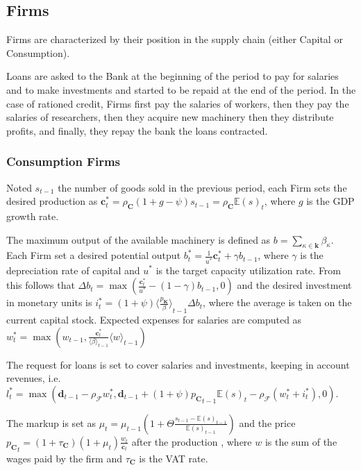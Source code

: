 \documentclass[a4paper, headings=standardclasses]{scrartcl}
\begin{document}
\subsection{Firms}
Firms are characterized by their position in the supply chain (either Capital or Consumption).

Loans are asked to the Bank at the beginning of the period to pay for salaries and to make investments and started to be repaid at the end of the period.
In the case of rationed credit, Firms first pay the salaries of workers, then they pay the salaries of researchers, then they acquire new machinery then they distribute profits, and finally, they repay the bank the loans contracted.

\subsubsection{Consumption Firms}
Noted $s_{t-1}$ the number of goods sold in the previous period, each Firm sets the desired production as $\mathbf{c}^*_t = \rho_\mathbf{C}(1+g-\psi)s_{t-1} = \rho_\mathbf{C}{\mathbb{E}(s)}_t$, where $g$ is the GDP growth rate.

The maximum output of the available machinery is defined as $b = \sum_{\kappa \in \mathbf{k}} \beta_\kappa$. Each Firm set a desired potential output $b^*_t = \frac{1}{u^*}\mathbf{c}^*_t + \gamma b_{t-1}$, where $\gamma$ is the depreciation rate of capital and $u^*$ is the target capacity utilization rate. From this follows that ${\Delta b}_t = \max(\frac{\mathbf{c}^*_t}{u^*} - (1 - \gamma) b_{t-1}, 0)$ and the desired investment in monetary units is $i^*_t = (1+\psi){\langle\frac{{p_\mathbf{K}}}{\beta}\rangle}_{t-1}{\Delta b}_t$, where the average is taken on the current capital stock. Expected expenses for salaries are computed as $w_t^* = \max(w_{t-1}, \frac{\mathbf{c}^*_t}{{\langle \beta \rangle}_{t-1}}{\langle w \rangle}_{t-1})$

The request for loans is set to cover salaries and investments, keeping in account revenues, i.e. $l_t^* = \max(\mathbf{d}_{t-1} - \rho_\mathcal{F} w_t^*, \mathbf{d}_{t-1} + (1+\psi){p_\mathbf{C}}_{t-1} {\mathbb{E}(s)}_t - \rho_\mathcal{F} (w_t^* + i_t^*), 0)$.

The markup is set as $\mu_t = \mu_{t-1}(1 + \Theta \frac{s_{t-1}-{\mathbb{E}(s)}_{t-1}}{{\mathbb{E}(s)}_{t-1}})$ and the price ${p_\mathbf{C}}_t = (1+\tau_\mathbf{C})(1+\mu_t)\frac{w_t}{\mathbf{c}_t}$ after the production \parencite[like in][]{caiani2016}, where $w$ is the sum of the wages paid by the firm and $\tau_\mathbf{C}$ is the VAT rate.
\end{document}
